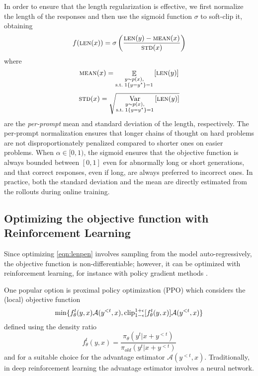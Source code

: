 In order to ensure that the length 
regularization is effective,
we first normalize the length of the responses and then use the sigmoid function $\sigma$ to soft-clip it, obtaining
\begin{equation}
f(\textsc{len}(x{}))
=
    \sigma \left( \frac{\textsc{len}(y{}) - \textsc{mean}(x{})}{\textsc{std}(x{})} \right)
\end{equation}
where 
\[
\textsc{mean}(x{}) = \mathop{\mathbb E}_{\substack{y\sim p(x),\\ \text{s.t.} 
\; {1}\{y = y^\star \} = 1 }} \left[\textsc{len}(y)\right]
\]
\[
\textsc{std}(x) = \sqrt{\operatorname*{Var}_{\substack{y\sim p(x),\\ \text{s.t.} 
\; {1}\{y = y^\star \} = 1 }}{\left[\textsc{len}(y)\right]}}
\]
are the \emph{per-prompt} mean and standard deviation of the length, 
respectively. 
The per-prompt normalization ensures that longer chains of thought on hard problems are not disproportionately penalized compared to shorter ones on easier problems.
When $\alpha \in [0, 1)$, the sigmoid  ensures that the objective function is always bounded between $[0, 1]$ even for abnormally long or short generations, and that
correct responses, even if long, are always preferred to incorrect ones.
In practice, both the standard deviation and the mean are directly estimated from the rollouts during online training.

\subsection{Optimizing the objective function  with Reinforcement Learning}

Since optimizing \cref{eqn:lenpen} involves sampling from the model auto-regressively,
the objective function is non-differentiable; 
however, it can be optimized with reinforcement learning, 
for instance with policy gradient methods
\citep{sutton2018reinforcement}.

One popular option is proximal policy optimization (PPO) \cite{schulman2017proximalpolicyoptimizationalgorithms} 
which considers the (local) objective function
\[ 
\min \{ f^t_{\theta}(y, x)\mathcal{A}(y^{<t}, x), \operatorname{clip}_{1-\epsilon}^{1+\epsilon}[ f^t_{\theta}(y, x)]\mathcal{A}(y^{<t}, x) \} \]
defined using the density ratio 
$$
f^t_{\theta}(y, x) = \frac{\pi_\theta(y^{t}|x + y^{<t})}{\pi_{old}(y^{t}|x + y^{<t})}
$$
and for a suitable choice for the advantage estimator $\mathcal{A}(y^{<t}, x)$. Traditionally, in deep reinforcement learning \cite{schulman2017proximalpolicyoptimizationalgorithms} the advantage estimator involves a neural network. 

